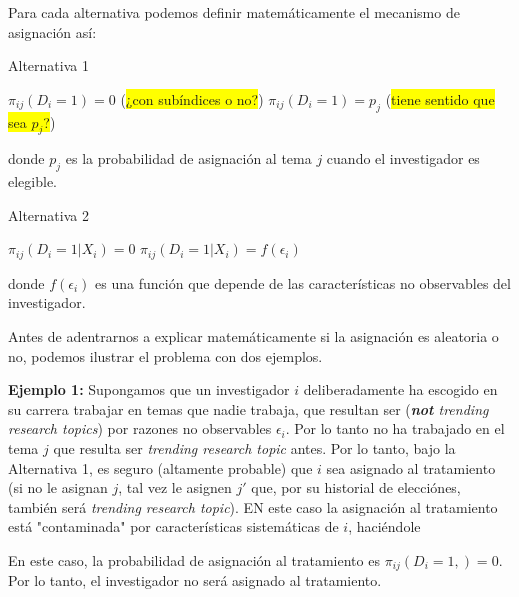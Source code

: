 \documentclass[12pt, letter]{article}
\begin{document}
Para cada alternativa podemos definir matemáticamente el mecanismo de asignación así:

\begin{algorithm}
\caption{Alternativa 1}
\begin{algorithmic}
            \STATE $\pi_{ij}(D_i = 1) = 0$ (\colorbox{yellow}{¿con subíndices o no?})
        \ELSE
            \STATE $\pi_{ij}(D_i = 1) = p_j$ (\colorbox{yellow}{tiene sentido que sea $p_j$?})
        \ENDIF
    \ENDFOR
\ENDFOR
\end{algorithmic}
\end{algorithm}

donde $p_j$ es la probabilidad de asignación al tema $j$ cuando el investigador es elegible.

\begin{algorithm}
\caption{Alternativa 2}
\begin{algorithmic}
            \STATE $\pi_{ij}(D_i = 1 | X_i) = 0$
        \ELSE
            \STATE $\pi_{ij}(D_i = 1 | X_i) = f(\epsilon_i)$
        \ENDIF
    \ENDFOR
\ENDFOR
\end{algorithmic}
\end{algorithm}

donde $f(\epsilon_i)$ es una función que depende de las características no observables del investigador.

Antes de adentrarnos a explicar matemáticamente si la asignación es aleatoria o no, podemos ilustrar el problema con dos ejemplos.

\textbf{Ejemplo 1:} Supongamos que un investigador $i$ deliberadamente ha escogido en su carrera trabajar en temas que nadie trabaja, que resultan ser (\textit{\textbf{not} trending research topics}) por razones no observables $\epsilon_i$. Por lo tanto no ha trabajado en el tema $j$ que resulta ser \textit{trending research topic} antes. Por lo tanto, bajo la Alternativa 1, es seguro (altamente probable) que $i$ sea asignado al tratamiento (si no le asignan $j$, tal vez le asignen $j'$ que, por su historial de elecciónes, también será \textit{trending research topic}). EN este caso la asignación al tratamiento está "contaminada" por características sistemáticas de $i$, haciéndole 

En este caso, la probabilidad de asignación al tratamiento es $\pi_{ij}(D_i = 1, ) = 0$. Por lo tanto, el investigador no será asignado al tratamiento.
\end{document}

